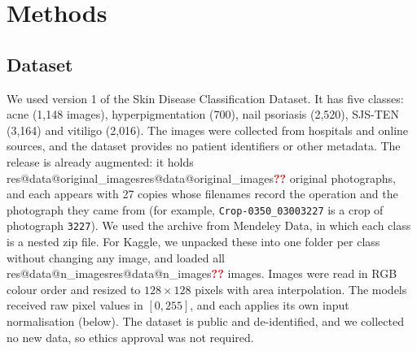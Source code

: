 \documentclass[11pt]{article}
\makeatletter
\newcommand{\res}[2]{\ifcsname res@#1@#2\endcsname\csname res@#1@#2\endcsname\else\textcolor{red}{\textbf{??}}\fi}
\makeatother
\begin{document}
\section*{Methods}

\subsection*{Dataset}
We used version 1 of the Skin Disease Classification Dataset\cite{khushbu2024dataset}. It has five classes: acne (1{,}148 images), hyperpigmentation (700), nail psoriasis (2{,}520), SJS-TEN (3{,}164) and vitiligo (2{,}016). The images were collected from hospitals and online sources, and the dataset provides no patient identifiers or other metadata. The release is already augmented: it holds \res{data}{original_images} original photographs, and each appears with 27 copies whose filenames record the operation and the photograph they came from (for example, \texttt{Crop-0350\_03003227} is a crop of photograph \texttt{3227}). We used the archive from Mendeley Data, in which each class is a nested zip file. For Kaggle, we unpacked these into one folder per class without changing any image, and loaded all \res{data}{n_images} images. Images were read in RGB colour order and resized to $128\times128$ pixels with area interpolation. The models received raw pixel values in $[0,255]$, and each applies its own input normalisation (below). The dataset is public and de-identified, and we collected no new data, so ethics approval was not required.
\end{document}
